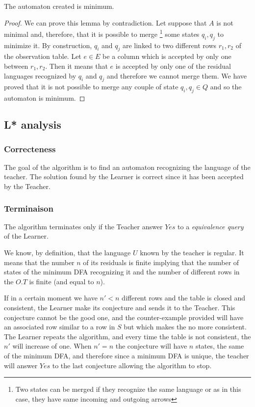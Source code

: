 \begin{lemma}
  The automaton created is minimum.
\end{lemma}

\begin{proof}
  We can prove this lemma by contradiction. Let suppose that $A$ is not minimal and, therefore, that it is possible to merge \footnote{Two states can be merged if they recognize the same language or as in this case, they have same incoming and outgoing arrows} some states $q_i, q_j$ to minimize it.
  By construction, $q_i$ and $q_j$ are linked to two different rows $r_1, r_2$ of the observation table.
  Let $e \in E$ be a column which is accepted by only one between $r_1, r_2$.
  Then it means that $e$ is accepted by only one of the residual languages recognized by $q_i$ and $q_j$ and therefore we cannot merge them.
  We have proved that it is not possible to merge any couple of state $q_i, q_j \in Q$ and so the automaton is minimum.
\end{proof}

\subsection{L* analysis}
\subsubsection{Correcteness}
The goal of the algorithm is to find an automaton recognizing the language of the teacher. The solution found by the Learner is correct since it has been accepted by the Teacher.
\subsubsection{Terminaison}
The algorithm terminates only if the Teacher answer $Yes$ to a \textit{equivalence query} of the Learner.

We know, by definition, that the language $U$ known by the teacher is regular. It means that the number $n$ of its residuals is finite implying that the number of states of the minimum DFA recognizing it and the number of different rows in the $O.T$ is finite (and equal to $n$).

If in a certain moment we have $n' < n$ different rows and the table is closed and consistent, the Learner make its conjecture and sends it to the Teacher. This conjecture cannot be the good one, and the counter-example provided will have an associated row similar to a row in $S$ but which makes the \OT no more consistent. The Learner repeats the algorithm, and every time the table is not consistent, the $n'$ will increase of one. When $n' = n$ the conjecture will have $n$ states, the same of the minimum DFA, and therefore since a minimum DFA is unique, the teacher will answer $Yes$ to the last conjecture allowing the algorithm to stop.

